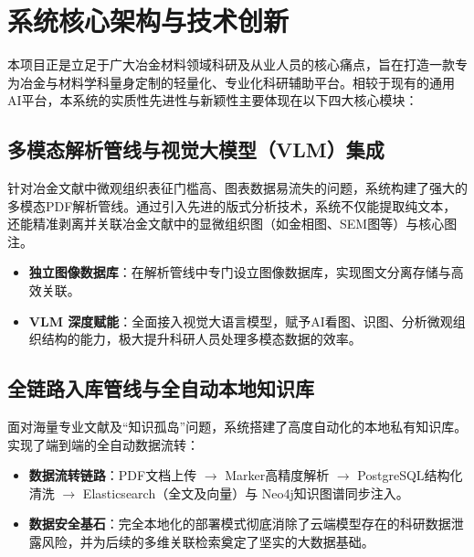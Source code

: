 \documentclass[a4paper, 12pt]{ctexart}
\begin{document}
\section{系统核心架构与技术创新}
本项目正是立足于广大冶金材料领域科研及从业人员的核心痛点，旨在打造一款专为冶金与材料学科量身定制的轻量化、专业化科研辅助平台。相较于现有的通用AI平台，本系统的实质性先进性与新颖性主要体现在以下四大核心模块：

\subsection{多模态解析管线与视觉大模型（VLM）集成}
针对冶金文献中微观组织表征门槛高、图表数据易流失的问题，系统构建了强大的多模态PDF解析管线。通过引入先进的版式分析技术，系统不仅能提取纯文本，还能精准剥离并关联冶金文献中的显微组织图（如金相图、SEM图等）与核心图注。
\begin{itemize}
    \item \textbf{独立图像数据库}：在解析管线中专门设立图像数据库，实现图文分离存储与高效关联。
    \item \textbf{VLM 深度赋能}：全面接入视觉大语言模型，赋予AI看图、识图、分析微观组织结构的能力，极大提升科研人员处理多模态数据的效率。
\end{itemize}

\subsection{全链路入库管线与全自动本地知识库}
面对海量专业文献及“知识孤岛”问题，系统搭建了高度自动化的本地私有知识库。实现了端到端的全自动数据流转：
\begin{itemize}
    \item \textbf{数据流转链路}：PDF文档上传 $\rightarrow$ Marker高精度解析 $\rightarrow$ PostgreSQL结构化清洗 $\rightarrow$ Elasticsearch（全文及向量）与 Neo4j知识图谱同步注入。
    \item \textbf{数据安全基石}：完全本地化的部署模式彻底消除了云端模型存在的科研数据泄露风险，并为后续的多维关联检索奠定了坚实的大数据基础。
\end{itemize}
\end{document}
